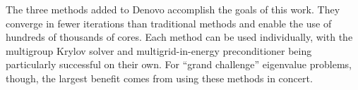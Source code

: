 \vspace*{0.5em}
\noindent       %
The three methods added to Denovo accomplish the goals of this work. They converge in fewer iterations than traditional methods and enable the use of hundreds of thousands of cores. Each method can be used individually, with the multigroup Krylov solver and multigrid-in-energy preconditioner being particularly successful on their own. For ``grand challenge'' eigenvalue problems, though, the largest benefit comes from using these methods in concert. 

